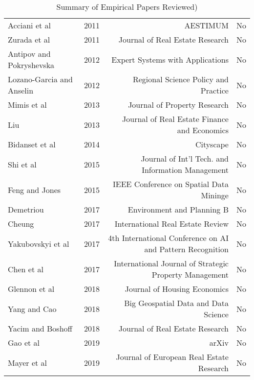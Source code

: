 \documentclass[colTwo]{anon}
\theoremstyle{definition}
\begin{document}
\begin{table*}[h!]
\begin{tabular}{|l|l|r|c|}
Acciani et al & 2011 & AESTIMUM & No \\
Zurada et al & 2011 & Journal of Real Estate Research & No \\
Antipov and Pokryshevska & 2012 & Expert Systems with Applications & No \\
Lozano-Garcia and Anselin & 2012 & Regional Science Policy and Practice & No \\
Mimis et al & 2013 & Journal of Property Research & No \\
Liu & 2013 & Journal of Real Estate Finance and Economics & No \\
Bidanset et al & 2014 & Cityscape & No \\
Shi et al & 2015 & Journal of Int'l Tech. and Information Management & No \\
Feng and Jones & 2015 & IEEE Conference on Spatial Data Mininge & No \\
Demetriou & 2017 & Environment and Planning B & No \\
Cheung & 2017 & International Real Estate Review & No \\
Yakubovskyi et al & 2017 & 4th International Conference on AI and Pattern Recognition & No \\
Chen et al & 2017 & International Journal of Strategic Property Management & No \\
Glennon et al  & 2018 & Journal of Housing Economics & No \\
Yang and Cao & 2018 & Big Geospatial Data and Data Science & No \\
Yacim and Boshoff & 2018 & Journal of Real Estate Research & No \\
Gao et al & 2019 & arXiv & No \\
Mayer et al & 2019 & Journal of European Real Estate Research & No \\
\hline
\end{tabular}
\caption{Summary of Empirical Papers Reviewed)}
\label{table:A1}
\end{table*}
\end{document}
